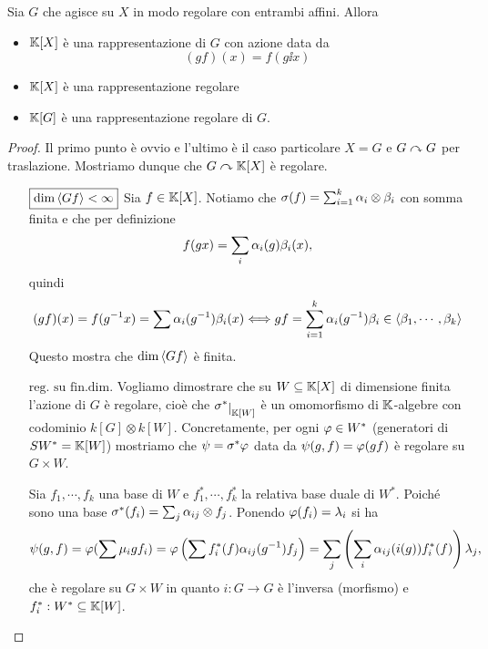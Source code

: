 \begin{lemma}
Sia $G$ che agisce su $X$ in modo regolare con entrambi affini. Allora
\begin{itemize}
    \item $\mathbb{K}[X]$ \`e una rappresentazione di $G$ con azione data da
    \[(gf)(x)=f(g\ii x)\]
    \item $\mathbb{K}[X]$ \`e una rappresentazione regolare
    \item $\mathbb{K}[G]$ \`e una rappresentazione regolare di $G$.
\end{itemize}
\end{lemma}
\begin{proof}
Il primo punto \`e ovvio e l'ultimo \`e il caso particolare $X=G$ e $G\curvearrowright G$ per traslazione. Mostriamo dunque che $G\curvearrowright \mathbb{K}[X]$ \`e regolare.
\setlength{\leftmargini}{0cm}
\begin{itemize}
\item[$\boxed{\dim \left\langle {Gf}\right\rangle<\infty}$] Sia $f\in \mathbb{K}[X]$. Notiamo che $\sigma(f)=\sum_{i=1}^k \alpha_i\otimes \beta_i$ con somma finita e che per definizione
\[f(gx)=\sum_i \alpha_i(g)\beta_i(x),\]
quindi
\[(gf)(x)=f(g^{-1} x)=\sum \alpha_i(g^{-1})\beta_i(x)\Longleftrightarrow gf=\sum_{i=1}^k \alpha_i(g^{-1})\beta_i\in \left\langle {\beta_1,\cdots,\beta_k}\right\rangle\]
Questo mostra che $\dim\left\langle {Gf}\right\rangle$ \`e finita.
\item[$\boxed{\text{reg. su fin.dim.}}$] Vogliamo dimostrare che su $W\subseteq \mathbb{K}[X]$ di dimensione finita l'azione di $G$ \`e regolare, cio\`e che $\sigma^\ast\res{\K[W]}$ \`e un omomorfismo di $\mathbb{K}$-algebre con codominio $k[G]\otimes k[W]$. Concretamente, per ogni $\varphi\in W^\ast$ (generatori di $SW^\ast=\mathbb{K}[W]$) mostriamo che $\psi=\sigma^\ast\varphi$ data da $\psi(g,f)=\varphi(gf)$ \`e regolare su $G\times W$.

Sia $f_1,\cdots, f_k$ una base di $W$ e $f_1^\ast,\cdots,f_k^\ast$ la relativa base duale di $W^\ast$. Poich\'e sono una base $\sigma^\ast(f_i)=\sum_j\alpha_{ij}\otimes f_j$. Ponendo $\varphi(f_i)=\lambda_i$ si ha
\[\psi(g,f)=\varphi(\sum \mu_i gf_i)=\varphi\left({\sum f_i^\ast(f)\alpha_{ij}(g^{-1})f_j}\right)=\sum_{j}\left({\sum_i\alpha_{ij}(i(g))f_i^\ast(f)}\right)\lambda_j,\]
che \`e regolare su $G\times W$ in quanto $i:G\to G$ \`e l'inversa (morfismo) e $f_i^\ast:W^\ast\subseteq \mathbb{K}[W]$.
\end{itemize}
\setlength{\leftmargini}{0.5cm}
\end{proof}

